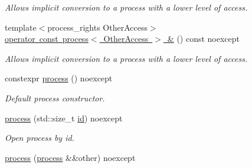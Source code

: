 \begin{DoxyCompactItemize}
\begin{DoxyCompactList}\small\item\em Allows implicit conversion to a process with a lower level of access. \end{DoxyCompactList}\item 
\mbox{\label{classdistant_1_1kernel__objects_1_1process_a7afdbe9eefdb12fe7c8cc5462b29ddcf}} 
{\footnotesize template$<$process\+\_\+rights Other\+Access$>$ }\\\mbox{\hyperlink{classdistant_1_1kernel__objects_1_1process_a7afdbe9eefdb12fe7c8cc5462b29ddcf}{operator const process$<$ Other\+Access $>$ \&}} () const noexcept
\begin{DoxyCompactList}\small\item\em Allows implicit conversion to a process with a lower level of access. \end{DoxyCompactList}\item 
\mbox{\label{classdistant_1_1kernel__objects_1_1process_a4df811c0599821d9c6940abb44162790}} 
constexpr \mbox{\hyperlink{classdistant_1_1kernel__objects_1_1process_a4df811c0599821d9c6940abb44162790}{process}} () noexcept
\begin{DoxyCompactList}\small\item\em Default process constructor. \end{DoxyCompactList}\item 
\mbox{\label{classdistant_1_1kernel__objects_1_1process_a3006196cbaf28858afb6f6185f05b6f0}} 
\mbox{\hyperlink{classdistant_1_1kernel__objects_1_1process_a3006196cbaf28858afb6f6185f05b6f0}{process}} (std\+::size\+\_\+t \mbox{\hyperlink{classdistant_1_1kernel__objects_1_1process__base_a553b90767de864164d807075f67c1402}{id}}) noexcept
\begin{DoxyCompactList}\small\item\em Open process by id. \end{DoxyCompactList}\item 
\mbox{\label{classdistant_1_1kernel__objects_1_1process_a7366312910893bf4ad49d947bc0fb172}} 
\mbox{\hyperlink{classdistant_1_1kernel__objects_1_1process_a7366312910893bf4ad49d947bc0fb172}{process}} (\mbox{\hyperlink{classdistant_1_1kernel__objects_1_1process}{process}} \&\&other) noexcept

\end{DoxyCompactItemize}
